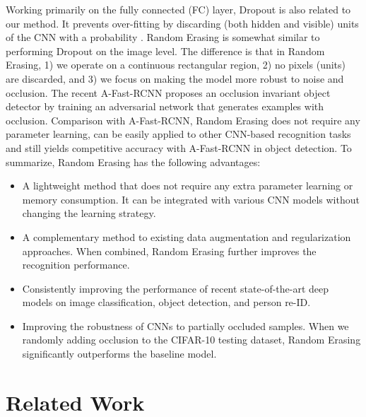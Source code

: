 \documentclass[10pt,twocolumn,letterpaper]{article}
\begin{document}
Working primarily on the fully connected (FC) layer, Dropout \cite{srivastava2014dropout} is also related to our method. It prevents over-fitting by discarding (both hidden and visible) units of the CNN with a probability . Random Erasing is somewhat similar to performing Dropout on the image level. The difference is that in Random Erasing, 1) we operate on a continuous rectangular region,  2) no pixels (units) are discarded, and 3) we focus on making the model more robust to noise and occlusion. The recent A-Fast-RCNN \cite{A-fast-rcnn} proposes an occlusion invariant object detector by training an adversarial network that generates examples with occlusion. Comparison with A-Fast-RCNN, Random Erasing does not require any parameter learning, can be easily applied to other CNN-based recognition tasks and still yields competitive accuracy with A-Fast-RCNN in object detection.
To summarize, Random Erasing has the following advantages:
\begin{itemize}
\item A lightweight method that does not require any extra parameter learning or memory consumption. It can be integrated with various CNN models without changing the learning strategy.
\item A complementary method to existing data augmentation and regularization approaches. When combined, Random Erasing further improves the recognition performance.
\item Consistently improving the performance of recent state-of-the-art deep models on image classification, object detection, and person re-ID. 
\item Improving the robustness of CNNs to partially occluded samples. When we randomly adding occlusion to the CIFAR-10 testing dataset, Random Erasing significantly outperforms the baseline model.
\end{itemize}

\section{Related Work}
\end{document}

